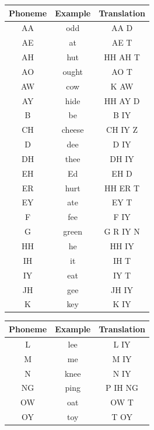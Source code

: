 \begin{figure}
    \begin{minipage}[t]{0.5\textwidth}
        \centering
        \begin{tabular}{ccc}
            \hline
            Phoneme & Example & Translation \\
            \hline
            AA & odd & AA D \\
            AE & at & AE T \\
            AH & hut & HH AH T \\
            AO & ought & AO T \\
            AW & cow & K AW \\
            AY & hide & HH AY D \\
            B & be & B IY \\
            CH & cheese & CH IY Z \\
            D & dee & D IY \\
            DH & thee & DH IY \\
            EH & Ed & EH D \\
            ER & hurt & HH ER T \\
            EY & ate & EY T \\
            F & fee & F IY \\
            G & green & G R IY N \\
            HH & he & HH IY \\
            IH & it & IH T \\
            IY & eat & IY T \\
            JH & gee & JH IY \\
            K & key & K IY \\
            \hline
        \end{tabular}
    \end{minipage}%
    \begin{minipage}[t]{0.5\textwidth}
        \centering
        \begin{tabular}{ccc}
            \hline
            Phoneme & Example & Translation \\
            \hline
            L & lee & L IY \\
            M & me & M IY \\
            N & knee & N IY \\
            NG & ping & P IH NG \\
            OW & oat & OW T \\
            OY & toy & T OY \\

\end{tabular}
\end{minipage}
\end{figure}
